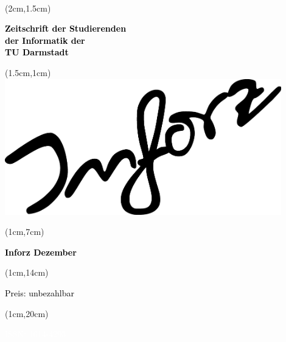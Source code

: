 \begin{titlepage}~


    \begin{textblock*}{12cm}(2cm,1.5cm)
        \begin{flushleft}
            \large\sffamily\textbf{
                \newline
                \textcolor{black}{Zeitschrift der Studierenden\\
                    der Informatik der \\
                    TU Darmstadt} }
        \end{flushleft}
    \end{textblock*}


    \begin{textblock*}{12cm}(1.5cm,1cm)
        \includegraphics[width=12cm]{grafik/inforz}
    \end{textblock*}


    \begin{textblock*}{5cm}(1cm,7cm)
        \begin{rotate}{90}
            \sffamily\huge\textbf{
                \textcolor{black}{Inforz Dezember \the\year}}
        \end{rotate}
    \end{textblock*}


    \begin{textblock*}{2cm}(1cm,14cm)
        \begin{rotate}{90}
            \textcolor{black}{\sffamily\small Preis: unbezahlbar}
        \end{rotate}
    \end{textblock*}


    \begin{textblock*}{2cm}(1cm,20cm)
        \begin{rotate}{90}
            \textcolor{white}{\sffamily ISSN: 1614-4295}
        \end{rotate}
    \end{textblock*}

\end{titlepage}
\newpage
